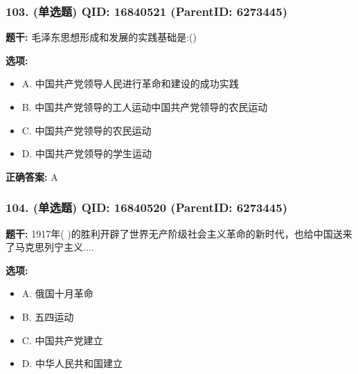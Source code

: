 \documentclass[12pt,UTF8]{ctexart}
\begin{document}
\vspace{0.3em}\hrulefill\vspace{0.7em}

\subsubsection*{103. (单选题) \small QID: 16840521 (ParentID: 6273445)}

\textbf{题干:}
毛泽东思想形成和发展的实践基础是:()



\textbf{选项:}
\begin{itemize}[leftmargin=*]

  \item A. 中国共产党领导人民进行革命和建设的成功实践

  \item B. 中国共产党领导的工人运动中国共产党领导的农民运动

  \item C. 中国共产党领导的农民运动

  \item D. 中国共产党领导的学生运动

\end{itemize}

\textbf{正确答案:}
A

\vspace{0.3em}\hrulefill\vspace{0.7em}

\subsubsection*{104. (单选题) \small QID: 16840520 (ParentID: 6273445)}

\textbf{题干:}
1917年( )的胜利开辟了世界无产阶级社会主义革命的新时代，也给中国送来了马克思列宁主义....



\textbf{选项:}
\begin{itemize}[leftmargin=*]

  \item A. 俄国十月革命

  \item B. 五四运动

  \item C. 中国共产党建立

  \item D. 中华人民共和国建立

\end{itemize}
\end{document}
